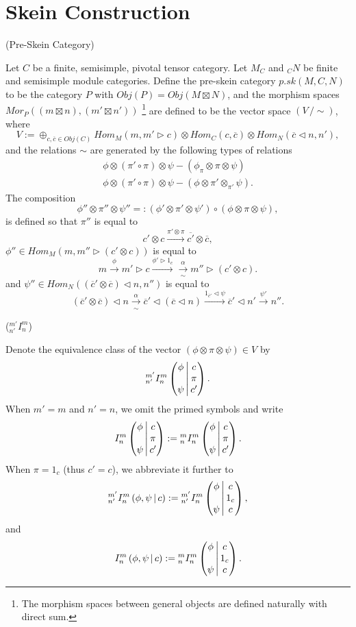 \section{Skein Construction}\label{section/skein-construction}

\begin{definition} (Pre-Skein Category)

  \noindent Let $C$ be a finite, semisimple, pivotal tensor category. Let
  $M_{C}$ and $ _{C}N$ be finite and semisimple module categories. Define the
  pre-skein category $p.sk(M,C,N)$ to be the category $P$ with
  $Obj(P) = Obj(M \boxtimes N)$, and the morphism spaces $Mor_{P}((m \boxtimes n), (m' \boxtimes n'))$
  \footnote{The morphism spaces between general objects are defined naturally
    with direct sum.} are defined to be the vector space $(V \,/ \sim)$, where
  \[
    V := \oplus_{c,\overline{c} \in Obj(C)} Hom_{M}(m, m' \rhd c) \otimes Hom_{C}(c,\overline{c}) \otimes Hom_{N} (\overline{c} \lhd n, n'),
  \]
  and the relations $\sim$ are generated by the following types of relations
  \begin{align}
    \phi \otimes (\pi' \circ \pi) \otimes \psi - (\phi_{\pi} \otimes \pi \otimes \psi)\\
    \phi \otimes (\pi' \circ \pi) \otimes \psi - (\phi \otimes \pi' \otimes _{\pi'}\psi).
  \end{align}
  The composition
  \[
    \phi'' \otimes \pi'' \otimes \psi'' =:
    (\phi' \otimes \pi' \otimes \psi' ) \circ (
    \phi \otimes \pi \otimes \psi ),
  \]
  is defined so that $\pi''$ is equal to
  \[
    c' \otimes c \xrightarrow{\pi' \otimes \pi} \overline{c'} \otimes \overline{c},
  \]
  \noindent $\phi'' \in Hom_{M}(m, m'' \rhd (c' \otimes c))$ is equal to
  \[
    m \xrightarrow{\phi} m' \rhd c \xrightarrow{\phi' \rhd 1_{c}} \xrightarrow[\sim]{\alpha} m'' \rhd (c' \otimes c).
  \]
  \noindent and $\psi'' \in Hom_{N}((\overline{c}' \otimes \overline{c}) \lhd n, n'')$ is equal to
  \[
    (\overline{c}' \otimes \overline{c}) \lhd n \xrightarrow[\sim]{\alpha} \overline{c}' \lhd (\overline{c} \lhd n) \xrightarrow{1_{\overline{c}'} \lhd \psi} \overline{c}' \lhd n' \xrightarrow{\psi'} n''.
  \]


\end{definition}

\begin{notation} (${}^{m'}_{n'}I^{m}_{n}$)

  \noindent Denote the equivalence class of the vector
  $(\phi \otimes \pi \otimes \psi) \in V$ by
  \[{}^{m'}_{n'} I^{m}_{n} \left( \begin{matrix} \phi \\ {}\\ \psi \end{matrix} \,\middle|\, \begin{matrix} c \\ \pi \\ c' \end{matrix} \right).\]
  When $m' = m$ and $n' = n$, we omit the primed symbols and write
  \[
    {}^{}_{} I^{m}_{n} \left( \begin{matrix} \phi \\ {}\\ \psi \end{matrix} \,\middle|\, \begin{matrix} c \\ \pi \\ c' \end{matrix} \right) :=
    {}^{m}_{n} I^{m}_{n} \left( \begin{matrix} \phi \\ {}\\ \psi \end{matrix} \,\middle|\, \begin{matrix} c \\ \pi \\ c' \end{matrix} \right).
  \]
  When $\pi = 1_{c}$ (thus $c' = c$), we abbreviate it further to
  \[
    {}^{m'}_{n'} I^{m}_{n} \left( \phi, \psi \,\middle|\, c \right) :=
    {}^{m'}_{n'} I^{m}_{n} \left( \begin{matrix} \phi \\ {}\\ \psi \end{matrix} \,\middle|\, \begin{matrix} c \\ 1_{c} \\ c \end{matrix} \right),
  \]
  and
  \[
    {}^{}_{} I^{m}_{n} \left( \phi, \psi \,\middle|\, c \right) :=
    {}^{m}_{n} I^{m}_{n} \left( \begin{matrix} \phi \\ {}\\ \psi \end{matrix} \,\middle|\, \begin{matrix} c \\ 1_{c} \\ c \end{matrix} \right).
  \]
\end{notation}

